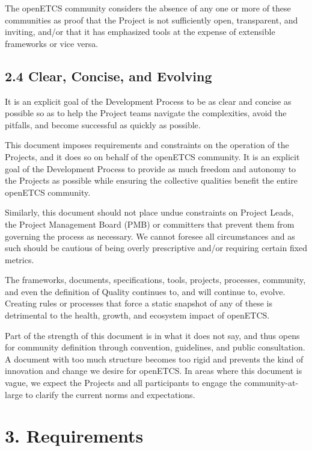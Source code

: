 The openETCS community considers the absence of any one or more of these
communities as proof that the Project is not sufficiently open,
transparent, and inviting, and/or that it has emphasized tools at the
expense of extensible frameworks or vice versa.

\subsection{2.4 Clear, Concise, and
Evolving}\label{clear-concise-and-evolving}

It is an explicit goal of the Development Process to be as clear and
concise as possible so as to help the Project teams navigate the
complexities, avoid the pitfalls, and become successful as quickly as
possible.

This document imposes requirements and constraints on the operation of
the Projects, and it does so on behalf of the openETCS community. It is
an explicit goal of the Development Process to provide as much freedom
and autonomy to the Projects as possible while ensuring the collective
qualities benefit the entire openETCS community.

Similarly, this document should not place undue constraints on Project
Leads, the Project Management Board (PMB) or committers that prevent
them from governing the process as necessary. We cannot foresee all
circumstances and as such should be cautious of being overly
prescriptive and/or requiring certain fixed metrics.

The frameworks, documents, specifications, tools, projects, processes,
community, and even the definition of Quality continues to, and will
continue to, evolve. Creating rules or processes that force a static
snapshot of any of these is detrimental to the health, growth, and
ecosystem impact of openETCS.

Part of the strength of this document is in what it does not say, and
thus opens for community definition through convention, guidelines, and
public consultation. A document with too much structure becomes too
rigid and prevents the kind of innovation and change we desire for
openETCS. In areas where this document is vague, we expect the Projects
and all participants to engage the community-at-large to clarify the
current norms and expectations.

\section{3. Requirements}\label{requirements}

